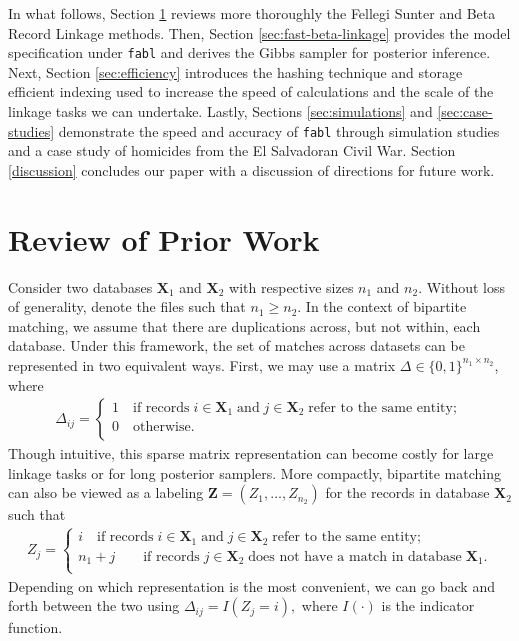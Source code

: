 \documentclass[12pt,letterpaper]{article}
\newcommand{\1}[1]{\mathbb{I}\!\left[#1\right]} %
\begin{document}
	In what follows, Section \ref{sec:review-of_prior-work} reviews more thoroughly the Fellegi Sunter and Beta Record Linkage methods. Then, Section \ref{sec:fast-beta-linkage} provides the model specification under \texttt{fabl} and derives the Gibbs sampler for posterior inference. Next, Section \ref{sec:efficiency} introduces the hashing technique and storage efficient indexing used to increase the speed of calculations and the scale of the linkage tasks we can undertake. Lastly, Sections \ref{sec:simulations} and \ref{sec:case-studies} demonstrate the speed and accuracy of \texttt{fabl} through simulation studies and a case study of homicides from the El Salvadoran Civil War. Section \ref{discussion} concludes our paper with a discussion of directions for future work. 
	

	
%	
	

\section{Review of Prior Work}
\label{sec:review-of_prior-work}

Consider two databases $\bm{X}_1$ and $\bm{X}_2$ with respective sizes $n_1$ and $n_2$. Without loss of generality, denote the files such that $n_1 \geq n_2$. In the context of bipartite matching, we assume that there are duplications across, but not within, each database. Under this framework, the set of matches across datasets can be represented in two equivalent ways. First, we may use a matrix $\Delta \in \{0, 1\}^{n_1 \times n_2}$, where
\begin{align}
	\Delta_{ij} =
	\begin{cases}
		1 \quad \text{if records}\;  i \in \bm{X}_1 \; \text{and}\; j\in \bm{X}_2 \; \text{refer to the same entity}; \\
		0 \quad \text{otherwise}.\\
	\end{cases}
\end{align}
Though intuitive, this sparse matrix representation can become costly for large linkage tasks or for long posterior samplers. More compactly, bipartite matching can also be viewed as a labeling $\bm{Z} = (Z_1, \ldots, Z_{n_2})$ for the records in database $\bm{X}_2$ such that 
\begin{align}
	Z_{j} =
	\begin{cases}
		i \quad \text{if records}\;  i \in \bm{X}_1 \; \text{and}\; j\in \bm{X}_2 \; \text{refer to the same entity}; \\
		n_1 + j \quad  \quad \text{if records}\;  j \in \bm{X}_2 \; \text{does not have a match in database}\; \bm{X}_1. \\
	\end{cases}
\end{align}
Depending on which representation is the most convenient, we can go back and forth between the two using $\Delta_{ij} = I(Z_j = i),$ where $I(\cdot)$ is the indicator function. 
\end{document}
